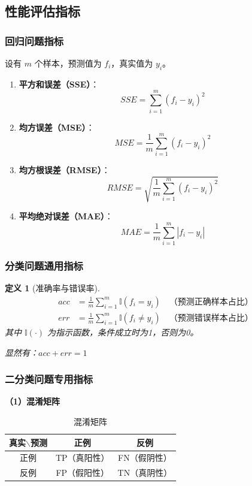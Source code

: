 \documentclass[12pt,a4paper]{ctexart}
\newtheorem{definition}{定义}[section]
\begin{document}
\subsection{性能评估指标}

\subsubsection{回归问题指标}

设有 $m$ 个样本，预测值为 $f_i$，真实值为 $y_i$。

\begin{enumerate}
    \item \textbf{平方和误差（SSE）}：
    \[
    SSE = \sum_{i=1}^{m}(f_i - y_i)^2
    \]
    
    \item \textbf{均方误差（MSE）}：
    \[
    MSE = \frac{1}{m}\sum_{i=1}^{m}(f_i - y_i)^2
    \]
    
    \item \textbf{均方根误差（RMSE）}：
    \[
    RMSE = \sqrt{\frac{1}{m}\sum_{i=1}^{m}(f_i - y_i)^2}
    \]
    
    \item \textbf{平均绝对误差（MAE）}：
    \[
    MAE = \frac{1}{m}\sum_{i=1}^{m}|f_i - y_i|
    \]
\end{enumerate}

\subsubsection{分类问题通用指标}

\begin{definition}[准确率与错误率]
\begin{align}
acc &= \frac{1}{m}\sum_{i=1}^{m}\mathbb{I}(f_i = y_i) \quad \text{（预测正确样本占比）} \\
err &= \frac{1}{m}\sum_{i=1}^{m}\mathbb{I}(f_i \neq y_i) \quad \text{（预测错误样本占比）}
\end{align}
其中 $\mathbb{I}(\cdot)$ 为指示函数，条件成立时为1，否则为0。

显然有：$acc + err = 1$
\end{definition}

\subsubsection{二分类问题专用指标}

\textbf{（1）混淆矩阵}

\begin{table}[H]
\centering
\caption{混淆矩阵}
\begin{tabular}{c|cc}
\toprule
真实$\backslash$预测 & 正例 & 反例 \\
\midrule
正例 & TP（真阳性） & FN（假阴性） \\
反例 & FP（假阳性） & TN（真阴性） \\
\bottomrule
\end{tabular}
\end{table}
\end{document}
